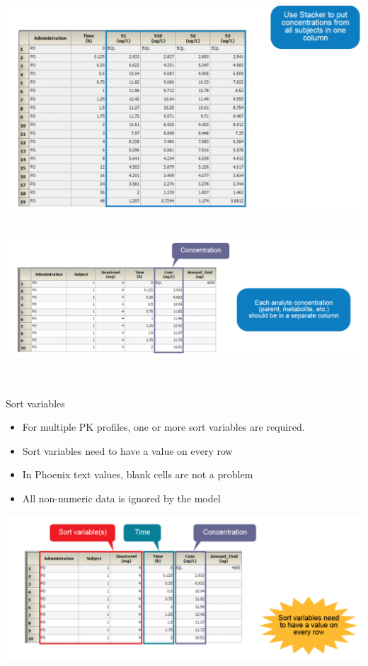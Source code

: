 \documentclass[
  letterpaper,
  DIV=11,
  numbers=noendperiod]{scrreprt}
\providecommand{\tightlist}{%
  \setlength{\itemsep}{0pt}\setlength{\parskip}{0pt}}\usepackage{longtable,booktabs,array}
\begin{document}
\includegraphics[width=5.60417in,height=\textheight]{./img_model/data-1.png}
\includegraphics[width=5.59375in,height=2.47917in]{./img_model/data-2.png}

Sort variables

\begin{itemize}
\tightlist
\item
  For multiple PK profiles, one or more sort variables are required.
\item
  Sort variables need to have a value on every row
\item
  In Phoenix text values, blank cells are not a problem
\item
  All non-numeric data is ignored by the model
\end{itemize}

\includegraphics{./img_model/data-3.png}
\end{document}
